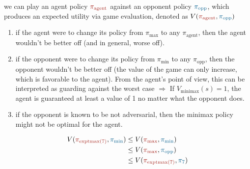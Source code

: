  we can play an agent policy
$\agentcolor{\pi_{\text{agent}}}$ against an opponent policy
$\oppcolor{\pi_{\text{opp}}}$, which produces an expected utility via game
evaluation, denoted as $V(\agentcolor{\pi_{\text{agent}}},
\oppcolor{\pi_{\text{opp}}})$
\begin{enumerate}
    \item if the agent were to change its policy from $\pi_{\text{max}}$ to any
        $\pi_{\text{agent}}$, then the agent wouldn't be better off (and in
        general, worse off). 
    \item if the opponent were to change its policy from $\pi_{\text{min}}$ to
        any $\pi_{\text{opp}}$, then the opponent wouldn't be better off (the
        value of the game can only increase, which is favorable to the agent).
        From the agent's point of view, this can be interpreted as guarding
        against the worst case $\Rightarrow$ If $V_{\text{minimax}}(s) = 1$, the
        agent is guaranteed at least a value of 1 no matter what the opponent
        does.
    \item if the opponent is known to be not adversarial, then the minimax
        policy might not be optimal for the agent.
\end{enumerate}
\begin{displaymath}
\begin{split}
V(\agentcolor{\pi_{\text{exptmax}(7)}}, \oppcolor{\pi_{\text{min}}}) &\le V(\agentcolor{\pi_{\text{max}}}, \oppcolor{\pi_{\text{min}}}) \\
&\le V(\agentcolor{\pi_{\text{max}}}, \oppcolor{\pi_{\text{opp}}}) \\
&\le V(\agentcolor{\pi_{\text{exptmax}(7)}}, \oppcolor{\pi_{\text{7}}})
\end{split}
\end{displaymath}

